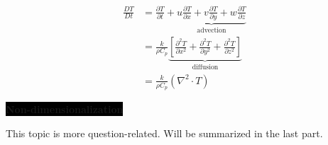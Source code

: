 \begin{itemize}
    \begin{align*}
        \frac{DT}{Dt} &= \frac{\partial T}{\partial t} + \underbrace{u \frac{\partial T}{\partial x} + v \frac{\partial T}{\partial y} + w \frac{\partial T}{\partial z}}_{\text{advection}} \\
        &= \frac{k}{\rho C_p} \underbrace{\left[ \frac{\partial^2 T}{\partial x^2} + \frac{\partial^2 T}{\partial y^2} + \frac{\partial^2 T}{\partial z^2} \right]}_{\text{diffusion}} \\
        &= \frac{k}{\rho C_p} (\nabla^2 \cdot T)
    \end{align*}
\end{itemize}

\colorbox{black}{\textbf{\color{white}Non-dimensionalization}}

This topic is more question-related. Will be summarized in the last part.